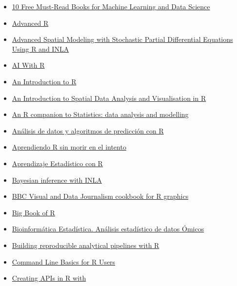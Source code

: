 \documentclass[
]{article}
\providecommand{\tightlist}{%
  \setlength{\itemsep}{0pt}\setlength{\parskip}{0pt}}
\begin{document}
\begin{itemize}
\tightlist
\item
  \href{https://www.kdnuggets.com/2017/04/10-free-must-read-books-machine-learning-data-science.html?utm_content=bufferc386f&utm_medium=social&utm_source=twitter.com&utm_campaign=buffer}{10
  Free Must-Read Books for Machine Learning and Data Science}
\item
  \href{https://adv-r.hadley.nz/index.html}{Advanced R}
\item
  \href{https://becarioprecario.bitbucket.io/spde-gitbook/}{Advanced
  Spatial Modeling with Stochastic Partial Differential Equations Using
  R and INLA}
\item
  \href{https://air.albert-rapp.de/}{AI With R}
\item
  \href{https://intro2r.com/}{An Introduction to R}
\item
  \href{https://www.spatialanalysisonline.com/An\%20Introduction\%20to\%20Spatial\%20Data\%20Analysis\%20in\%20R.pdf}{An
  Introduction to Spatial Data Analysis and Visualisation in R}
\item
  \href{https://mspeekenbrink.github.io/sdam-r-companion/index.html}{An
  R companion to Statistics: data analysis and modelling}
\item
  \href{http://rafalab.dfci.harvard.edu/dslibro/}{Análisis de datos y
  algoritmos de predicción con R}
\item
  \href{https://aprendiendo-r-intro.netlify.app/}{Aprendiendo R sin
  morir en el intento}
\item
  \href{https://rubenfcasal.github.io/aprendizaje_estadistico/index.html}{Aprendizaje
  Estadístico con R}
\item
  \href{https://becarioprecario.bitbucket.io/inla-gitbook/index.html}{Bayesian
  inference with INLA}
\item
  \href{https://bbc.github.io/rcookbook/}{BBC Visual and Data Journalism
  cookbook for R graphics}
\item
  \href{https://www.bigbookofr.com/index.html}{Big Book of R}
\item
  \href{https://www.uv.es/ayala/docencia/tami/tami13.pdf}{Bioinformática
  Estadística. Análisis estadístico de datos Ómicos}
\item
  \href{https://raps-with-r.dev/}{Building reproducible analytical
  pipelines with R}
\item
  \href{https://bash-intro.rsquaredacademy.com/}{Command Line Basics for
  R Users}
\item
  \href{https://www.rplumber.io/docs/index.html}{Creating APIs in R with
}
\end{itemize}
\end{document}
